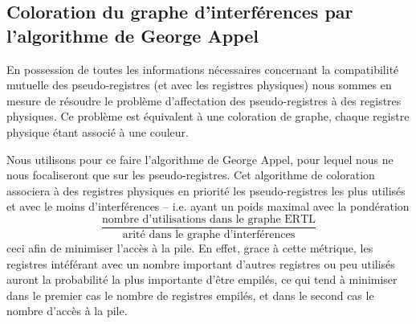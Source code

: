 \subsection{Coloration du graphe d'interf\'erences par l'algorithme de George Appel}

En possession de toutes les informations n\'ecessaires concernant la compatibilit\'e mutuelle des pseudo-registres (et avec les registres physiques) nous sommes en mesure de r\'esoudre le probl\`eme d'affectation des pseudo-registres \`a des registres physiques. Ce probl\`eme est \'equivalent \`a une coloration de graphe, chaque registre physique \'etant associ\'e \`a une couleur.

Nous utilisons pour ce faire l'algorithme de George Appel, pour lequel nous ne nous focaliseront que sur les pseudo-registres. Cet algorithme de coloration associera \`a des registres physiques en priorit\'e les pseudo-registres les plus utilis\'es et avec le moins d'interf\'erences -- i.e. ayant un poids maximal avec la pond\'eration \[\frac{\text{nombre d'utilisations dans le graphe ERTL}}{\text{arit\'e dans le graphe d'interf\'erences}}\] ceci afin de minimiser l'acc\`es \`a la pile. En effet, grace \`a cette m\'etrique, les registres int\'ef\'erant avec un nombre important d'autres registres ou peu utilis\'es auront la probabilit\'e la plus importante d'être empil\'es, ce qui tend \`a minimiser  dans le premier cas le nombre de registres empil\'es, et dans le second cas le nombre d'acc\`es \`a la pile.

